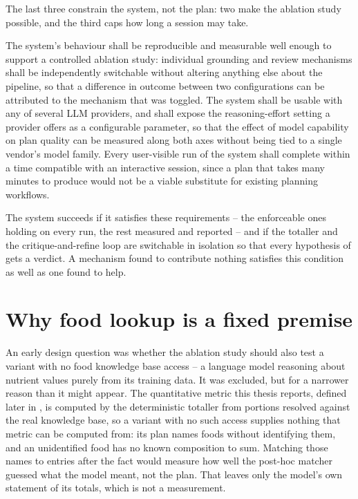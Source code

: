 The last three constrain the system, not the plan: two make the ablation study possible, and the third caps how long a session may take.

\begin{description}
     The system's behaviour shall be reproducible and measurable well enough to support a controlled ablation study: individual grounding and review mechanisms shall be independently switchable without altering anything else about the pipeline, so that a difference in outcome between two configurations can be attributed to the mechanism that was toggled.
     The system shall be usable with any of several LLM providers, and shall expose the reasoning-effort setting a provider offers as a configurable parameter, so that the effect of model capability on plan quality can be measured along both axes without being tied to a single vendor's model family.
     Every user-visible run of the system shall complete within a time compatible with an interactive session, since a plan that takes many minutes to produce would not be a viable substitute for existing planning workflows.
\end{description}

The system succeeds if it satisfies these requirements -- the enforceable ones holding on every run, the rest measured and reported -- and if the totaller and the critique-and-refine loop are switchable in isolation so that every hypothesis of  gets a verdict. A mechanism found to contribute nothing satisfies this condition as well as one found to help.

\section{Why food lookup is a fixed premise}
\label{sec:vision-food-lookup-premise}

An early design question was whether the ablation study should also test a variant with no food knowledge base access -- a language model reasoning about nutrient values purely from its training data. It was excluded, but for a narrower reason than it might appear. The quantitative metric this thesis reports, defined later in , is computed by the deterministic totaller from portions resolved against the real knowledge base, so a variant with no such access supplies nothing that metric can be computed from: its plan names foods without identifying them, and an unidentified food has no known composition to sum. Matching those names to entries after the fact would measure how well the post-hoc matcher guessed what the model meant, not the plan. That leaves only the model's own statement of its totals, which is not a measurement.

